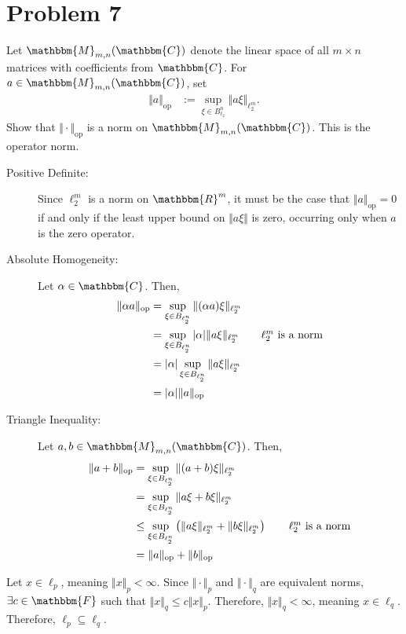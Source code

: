\documentclass[10pt]{extarticle}
\newcommand{\R}{\mathbbm{R}}
\begin{document}
  \section{Problem 7}%
  Let $\mathbbm{M}_{m,n}(\mathbbm{C})$ denote the linear space of all $m\times n$ matrices with coefficients from $\mathbbm{C}$. For $a\in \mathbbm{M}_{m,n}(\mathbbm{C})$, set
  \begin{align*}
    \Vert a\Vert_{\text{op}} &:= \sup_{\xi\in B_{\ell_2}^n}\Vert a\xi\Vert_{\ell_2^{m}}.
  \end{align*}
  Show that $\Vert \cdot \Vert_{\text{op}}$ is a norm on $\mathbbm{M}_{m,n}(\mathbbm{C})$. This is the operator norm.
  \begin{description}
    \item[Positive Definite:] Since $\ell_{2}^{m}$ is a norm on $\R^m$, it must be the case that $\Vert a\Vert_{\text{op}} = 0$ if and only if the least upper bound on $\Vert a\xi\Vert$ is zero, occurring only when $a$ is the zero operator.
    \item[Absolute Homogeneity:] Let $\alpha\in \mathbbm{C}$. Then,
      \begin{align*}
        \Vert \alpha a \Vert_{\text{op}} &= \sup_{\xi\in B_{\ell_2^{n}}}\Vert (\alpha a)\xi\Vert_{\ell_{2}^{m}}\\
                                         &= \sup_{\xi\in B_{\ell_{2}^{n}}}|\alpha|\Vert a \xi \Vert_{\ell_{2}^{m}}\tag*{$\ell_{2}^{m}$ is a norm}\\
                                         &= |\alpha|\sup_{\xi\in B_{\ell_2^{n}}}\Vert a \xi\Vert_{\ell_{2}^{m}}\\
                                         &= |\alpha|\Vert a \Vert_{\text{op}}
      \end{align*}
    \item[Triangle Inequality:] Let $a,b \in \mathbbm{M}_{m,n}(\mathbbm{C})$. Then,
      \begin{align*}
        \Vert a + b \Vert_{\text{op}} &= \sup_{\xi\in B_{\ell_{2}^{n}}} \Vert (a+b)\xi\Vert_{\ell_{2}^{m}}\\
                                      &= \sup_{\xi \in B_{\ell_{2}^{n}}} \Vert a\xi + b\xi\Vert_{\ell_2^{m}}\\
                                      &\leq \sup_{\xi\in B_{\ell_2^{n}}} \left(\Vert a\xi\Vert_{\ell_{2}^{m}} + \Vert b\xi\Vert_{\ell_{2}^{m}}\right)\tag*{$\ell_{2}^{m}$ is a norm}\\
                                      &= \Vert a\Vert_{\text{op}} + \Vert b \Vert_{\text{op}}
      \end{align*}
  \end{description}
  Let $x\in \ell_{p}$, meaning $\Vert x \Vert_p < \infty$. Since $\Vert \cdot \Vert_{p}$ and $\Vert \cdot \Vert_q$ are equivalent norms, $\exists c\in \mathbbm{F}$ such that $\Vert x \Vert_{q} \leq c\Vert x \Vert_{p}$. Therefore, $\Vert x \Vert_{q} < \infty$, meaning $x\in \ell_{q}$. Therefore, $\ell_{p} \subseteq \ell_{q}$.
\end{document}
